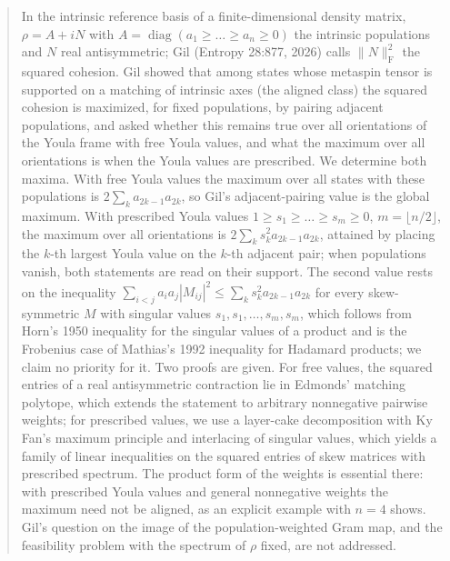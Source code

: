 \documentclass[11pt]{article}
\newcommand{\F}{\mathrm F}
\DeclareMathOperator{\diag}{diag}
\begin{document}
\hypnosmaketitle
\begin{abstract}
In the intrinsic reference basis of a finite-dimensional density matrix,
$\rho=A+iN$ with $A=\diag(a_1\ge\dots\ge a_n\ge0)$ the intrinsic populations
and $N$ real antisymmetric; Gil (Entropy 28:877, 2026) calls $\|N\|_\F^2$ the
squared cohesion. Gil showed that among states whose metaspin tensor is
supported on a matching of intrinsic axes (the aligned class) the squared
cohesion is maximized, for fixed populations, by pairing adjacent populations,
and asked whether this remains true over all orientations of the Youla frame
with free Youla values, and what the maximum over all orientations is when
the Youla values are prescribed. We determine both maxima. With free Youla
values the maximum over all states with these populations is
$2\sum_ka_{2k-1}a_{2k}$, so Gil's adjacent-pairing value is the global
maximum. With prescribed Youla values $1\ge s_1\ge\dots\ge s_m\ge0$,
$m=\lfloor n/2\rfloor$, the maximum over all orientations is
$2\sum_ks_k^2a_{2k-1}a_{2k}$, attained by placing the $k$-th largest Youla
value on the $k$-th adjacent pair; when populations vanish, both statements
are read on their support. The second value rests on the inequality
$\sum_{i<j}a_ia_j|M_{ij}|^2\le\sum_ks_k^2a_{2k-1}a_{2k}$ for every
skew-symmetric $M$ with singular values $s_1,s_1,\dots,s_m,s_m$, which
follows from Horn's 1950 inequality for the singular values of a product and
is the Frobenius case of Mathias's 1992 inequality for Hadamard products; we
claim no priority for it. Two proofs are given. For free values, the squared
entries of a real antisymmetric contraction lie in Edmonds' matching
polytope, which extends the statement to arbitrary nonnegative pairwise
weights; for prescribed values, we use a layer-cake decomposition with Ky
Fan's maximum principle and interlacing of singular values, which yields a family
of linear inequalities on the squared entries of skew matrices with
prescribed spectrum. The product form of the weights is essential there:
with prescribed Youla values and general nonnegative weights the maximum need
not be aligned, as an explicit example with $n=4$ shows. Gil's question on
the image of the population-weighted Gram map, and the feasibility problem
with the spectrum of $\rho$ fixed, are not addressed.
\end{abstract}
\end{document}
